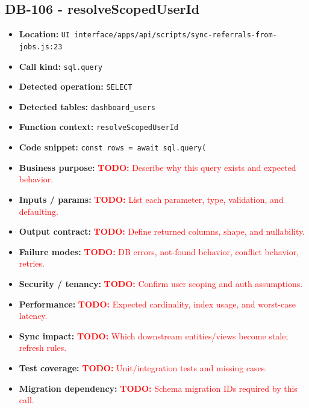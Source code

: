 \documentclass[11pt]{article}
\newcommand{\todoitem}[1]{\textcolor{red}{\textbf{TODO:} #1}}
\begin{document}
\subsection{DB-106 - resolveScopedUserId}
\begin{itemize}[leftmargin=1.5em]
\item \textbf{Location:} \texttt{UI interface/apps/api/scripts/sync-referrals-from-jobs.js:23}
\item \textbf{Call kind:} \texttt{sql.query}
\item \textbf{Detected operation:} \texttt{SELECT}
\item \textbf{Detected tables:} \texttt{dashboard\_users}
\item \textbf{Function context:} \texttt{resolveScopedUserId}
\item \textbf{Code snippet:} \texttt{const rows = await sql.query(}
\item \textbf{Business purpose:} \todoitem{Describe why this query exists and expected behavior.}
\item \textbf{Inputs / params:} \todoitem{List each parameter, type, validation, and defaulting.}
\item \textbf{Output contract:} \todoitem{Define returned columns, shape, and nullability.}
\item \textbf{Failure modes:} \todoitem{DB errors, not-found behavior, conflict behavior, retries.}
\item \textbf{Security / tenancy:} \todoitem{Confirm user scoping and auth assumptions.}
\item \textbf{Performance:} \todoitem{Expected cardinality, index usage, and worst-case latency.}
\item \textbf{Sync impact:} \todoitem{Which downstream entities/views become stale; refresh rules.}
\item \textbf{Test coverage:} \todoitem{Unit/integration tests and missing cases.}
\item \textbf{Migration dependency:} \todoitem{Schema migration IDs required by this call.}
\end{itemize}
\end{document}
